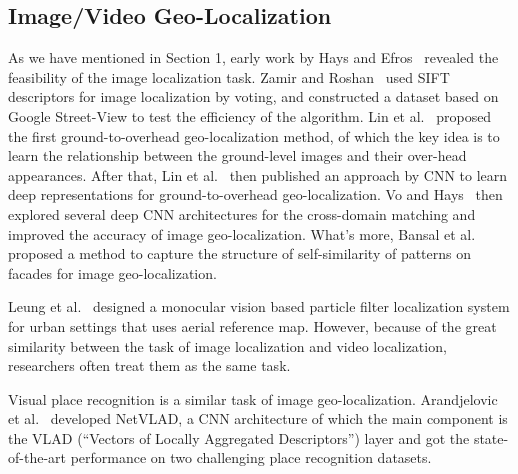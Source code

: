 \subsection{Image/Video Geo-Localization}
\par
As we have mentioned in Section 1, early work by Hays and Efros~\cite{hays2008im2gps} revealed the feasibility of the image localization task. Zamir and Roshan~\cite{zamir2010accurate} used SIFT descriptors for image localization by voting, and constructed a dataset based on Google Street-View to test the efficiency of the algorithm. Lin et al.~\cite{lin2013cross} proposed the first ground-to-overhead geo-localization method, of which the key idea is to learn the relationship between the ground-level images and their over-head appearances. After that, Lin et al.~\cite{lin2015learning} then published an approach by CNN to learn deep representations for ground-to-overhead geo-localization. Vo and Hays~\cite{vo2016localizing} then explored several deep CNN architectures for the cross-domain matching and improved the accuracy of image geo-localization. What's more, Bansal et al.~\cite{bansal2012ultra} proposed a method to capture the structure of self-similarity of patterns on facades for image geo-localization.
\par
Leung et al.~\cite{leung2008localization} designed a monocular vision based particle filter localization system for urban settings that uses aerial reference map. However, because of the great similarity between the task of image localization and video localization, researchers often treat them as the same task.
\par
Visual place recognition is a similar task of image geo-localization. Arandjelovic et al.~\cite{Arandjelovic16} developed NetVLAD, a CNN architecture of which the main component is the VLAD (``Vectors of Locally Aggregated Descriptors'') layer and got the state-of-the-art performance on two challenging place recognition datasets. 

